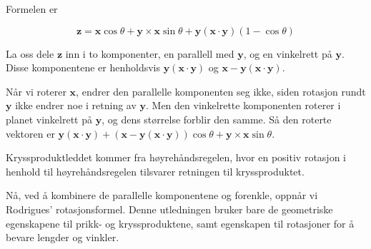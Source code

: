 Formelen er

\begin{equation*}
\mathbf{z}=\mathbf{x} \cos \theta+\mathbf{y} \times \mathbf{x} \sin \theta+\mathbf{y}(\mathbf{x} \cdot \mathbf{y})(1-\cos \theta)
\end{equation*}

La oss dele $\mathbf{z}$ inn i to komponenter, en parallell med $\mathbf{y}$, og en vinkelrett på $\mathbf{y}$. Disse komponentene er henholdsvis $\mathbf{y}(\mathbf{x} \cdot \mathbf{y})$ og $\mathbf{x} - \mathbf{y}(\mathbf{x} \cdot \mathbf{y})$. 

Når vi roterer $\mathbf{x}$, endrer den parallelle komponenten seg ikke, siden rotasjon rundt $\mathbf{y}$ ikke endrer noe i retning av $\mathbf{y}$. Men den vinkelrette komponenten roterer i planet vinkelrett på $\mathbf{y}$, og dens størrelse forblir den samme. Så den roterte vektoren er $\mathbf{y}(\mathbf{x} \cdot \mathbf{y}) + (\mathbf{x} - \mathbf{y}(\mathbf{x} \cdot \mathbf{y}))\cos \theta + \mathbf{y} \times \mathbf{x} \sin \theta$. 

Kryssproduktleddet kommer fra høyrehåndsregelen, hvor en positiv rotasjon i henhold til høyrehåndsregelen tilsvarer retningen til kryssproduktet. 

Nå, ved å kombinere de parallelle komponentene og forenkle, oppnår vi Rodrigues' rotasjonsformel. Denne utledningen bruker bare de geometriske egenskapene til prikk- og kryssproduktene, samt egenskapen til rotasjoner for å bevare lengder og vinkler.